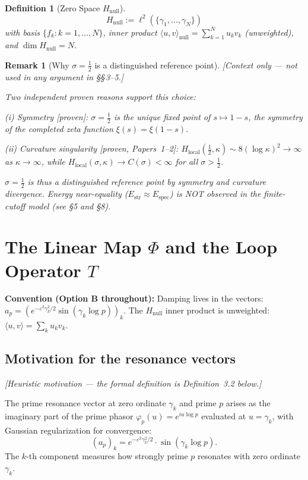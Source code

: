 \documentclass[11pt]{article}
\newtheorem{definition}[theorem]{Definition}
\newtheorem*{remark}{Remark}
\newcommand{\Hnull}{H_{\mathrm{null}}}
\newcommand{\Estr}{E_{\mathrm{str}}}
\newcommand{\Espec}{E_{\mathrm{spec}}}
\newcommand{\Hlocal}{H_{\mathrm{local}}}
\begin{document}
\begin{definition}[Zero Space $\Hnull$]
\[
\Hnull := \ell^2(\{\gamma_1,\ldots,\gamma_N\})
\]
with basis $\{f_k:k=1,\ldots,N\}$, inner product
$\langle u,v\rangle_{\mathrm{null}}=\sum_{k=1}^N u_k v_k$
(unweighted), and $\dim\Hnull=N$.
\end{definition}

\begin{remark}[Why $\sigma=\tfrac12$ is a distinguished reference point]
\label{rem:half}
\emph{[Context only --- not used in any argument in \S\S\,3--5.]}

Two independent proven reasons support this choice:

\emph{(i) Symmetry} [proven]: $\sigma=\tfrac12$ is the unique fixed point of
$s\mapsto 1-s$, the symmetry of the completed zeta function
$\xi(s)=\xi(1-s)$.

\emph{(ii) Curvature singularity} [proven, Papers~1--2]:
$\Hlocal(\tfrac12,\kappa)\sim 8(\log\kappa)^2\to\infty$ as $\kappa\to\infty$,
while $\Hlocal(\sigma,\kappa)\to C(\sigma)<\infty$ for all $\sigma>\tfrac12$.

$\sigma=\tfrac12$ is thus a distinguished reference point by symmetry and
curvature divergence. Energy near-equality ($\Estr\approx\Espec$) is NOT
observed in the finite-cutoff model (see \S5 and \S8).
\end{remark}

\section{The Linear Map $\Phi$ and the Loop Operator $T$}

\textbf{Convention (Option B throughout):} Damping lives in the vectors:
$a_p=(e^{-\varepsilon^2\gamma_k^2/2}\sin(\gamma_k\log p))_k$.
The $\Hnull$ inner product is unweighted: $\langle u,v\rangle=\sum_k u_kv_k$.

\subsection{Motivation for the resonance vectors}

\emph{[Heuristic motivation --- the formal definition is Definition~3.2 below.]}

The prime resonance vector at zero ordinate $\gamma_k$ and prime $p$ arises as
the imaginary part of the prime phasor $\varphi_p(u)=e^{iu\log p}$ evaluated
at $u=\gamma_k$, with Gaussian regularization for convergence:
\[
(a_p)_k = e^{-\varepsilon^2\gamma_k^2/2}\cdot\sin(\gamma_k\log p).
\]
The $k$-th component measures how strongly prime $p$ resonates with zero
ordinate $\gamma_k$.
\end{document}
